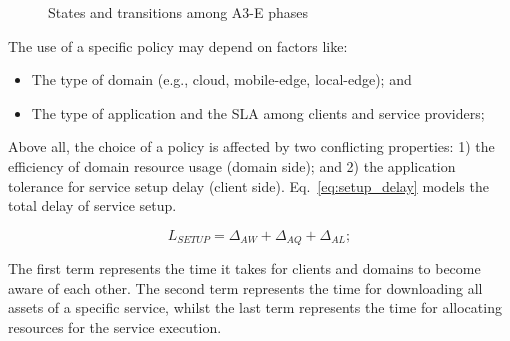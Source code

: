 \begin{figure}[htbp]
	\raggedright
	\hfill
	
	\hfill
	\caption{States and transitions among A3-E phases} \label{fig:A3-E-phases}
\end{figure}

The use of a specific policy may depend on factors like:

\begin{itemize}

\item The type of domain (e.g., cloud, mobile-edge, local-edge); and

\item The type of application and the SLA among clients and service  providers;

\end{itemize}

Above all, the choice of a policy is affected by two conflicting properties: 1) the efficiency of domain resource usage (domain side); and 2) the application tolerance for service setup delay (client side). Eq.~\ref{eq:setup_delay} models the total delay of service setup.

\begin{equation}\label{eq:setup_delay}
L_{SETUP} = \Delta_{AW} + \Delta_{AQ} + \Delta_{AL};
\end{equation}

The first term represents the time it takes for clients and domains to become aware of each other. The second term represents the time for downloading all assets of a specific service, whilst the last term represents the time for allocating resources for the service execution. 

